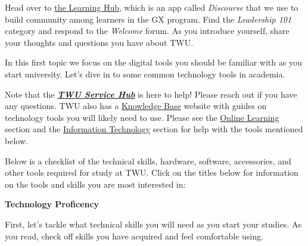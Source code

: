 \documentclass[
]{book}
\theoremstyle{definition}
\theoremstyle{definition}
\theoremstyle{definition}
\theoremstyle{definition}
\theoremstyle{remark}
\begin{document}
\begin{reflect}
Head over to \href{https://twu.discourse.group}{the Learning Hub}, which is an app called \emph{Discourse} that we use to build community among learners in the GX program. Find the \emph{Leadership 101} category and respond to the \emph{Welcome} forum. As you introduce yourself, share your thoughts and questions you have about TWU.
\end{reflect}

In this first topic we focus on the digital tools you should be familiar with as you start university. Let's dive in to some common technology tools in academia.

\begin{feedback}
Note that the
\href{https://trinitywestern.teamdynamix.com/TDClient/1904/Portal/KB/ArticleDet?ID=16267}{\textbf{\emph{TWU
Service Hub}}} is here to help! Please reach out if you have any
questions. TWU also has a
\href{https://trinitywestern.teamdynamix.com/TDClient/1904/Portal/KB/}{Knowledge
Base} website with guides on technology tools you will likely need to
use. Please see the
\href{https://trinitywestern.teamdynamix.com/TDClient/1904/Portal/KB/?CategoryID=4747}{Online
Learning} section and the
\href{https://trinitywestern.teamdynamix.com/TDClient/1904/Portal/KB/?CategoryID=21800}{Information
Technology} section for help with the tools mentioned below.
\end{feedback}

Below is a checklist of the technical skills, hardware, software, accessories, and other tools required for study at TWU. Click on the titles below for information on the tools and skills you are most interested in:

\textbf{Technology Proficency}

First, let's tackle what technical skills you will need as you start your studies. As you read, check off skills you have acquired and feel comfortable using.
\end{document}
